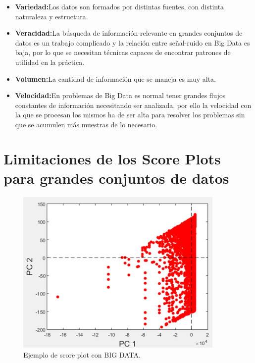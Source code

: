 \begin{itemize}
	\item \textbf{Variedad:}Los datos son formados por distintas fuentes, con distinta naturaleza y estructura.
	
	\item \textbf{Veracidad:}La búsqueda de información relevante en grandes conjuntos de datos es un trabajo complicado y la relación entre señal-ruido en Big Data es baja, por lo que se necesitan técnicas capaces de encontrar patrones de utilidad en la práctica.
	
	\item \textbf{Volumen:}La cantidad de información que se maneja es muy alta.
	
	\item \textbf{Velocidad:}En problemas de Big Data es normal tener grandes flujos constantes de información necesitando ser analizada, por ello la velocidad con la que se procesan los mismos ha de ser alta para resolver los problemas sin que se acumulen más muestras de lo necesario.
	
\end{itemize}


\section{Limitaciones de los Score Plots para grandes conjuntos de datos}

\begin{figure}[H]
\centering
\includegraphics[width=0.9\textwidth]{imagenes/figuras/3_1.png}
\caption{Ejemplo de score plot con BIG DATA.}
\end{figure}

